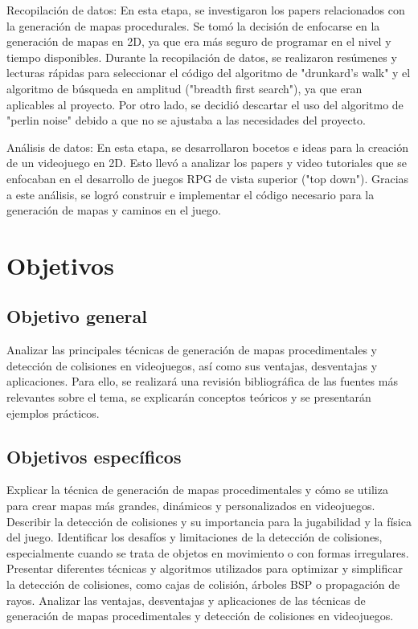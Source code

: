 \documentclass[stu, 12pt, letterpaper, donotrepeattitle, floatsintext, natbib]{apa7}
\begin{document}
Recopilación de datos:
En esta etapa, se investigaron los papers relacionados con la generación de mapas procedurales. Se tomó la decisión de enfocarse en la generación de mapas en 2D, ya que era más seguro de programar en el nivel y tiempo disponibles. Durante la recopilación de datos, se realizaron resúmenes y lecturas rápidas para seleccionar el código del algoritmo de "drunkard's walk" y el algoritmo de búsqueda en amplitud ("breadth first search"), ya que eran aplicables al proyecto. Por otro lado, se decidió descartar el uso del algoritmo de "perlin noise" debido a que no se ajustaba a las necesidades del proyecto.

Análisis de datos:
En esta etapa, se desarrollaron bocetos e ideas para la creación de un videojuego en 2D. Esto llevó a analizar los papers y video tutoriales que se enfocaban en el desarrollo de juegos RPG de vista superior ("top down"). Gracias a este análisis, se logró construir e implementar el código necesario para la generación de mapas y caminos en el juego.
\noindent {}

\vspace{10pt}
\vspace{10pt}
\vspace{10pt}
\vspace{10pt}
\vspace{10pt}
\vspace{10pt}

\section{\large Objetivos}
\subsection{Objetivo general} 
Analizar las principales técnicas de generación de mapas procedimentales y detección de colisiones en videojuegos, así como sus ventajas, desventajas y aplicaciones. Para ello, se realizará una revisión bibliográfica de las fuentes más relevantes sobre el tema, se explicarán conceptos teóricos y se presentarán ejemplos prácticos.
\subsection{Objetivos específicos} 
Explicar la técnica de generación de mapas procedimentales y cómo se utiliza para crear mapas más grandes, dinámicos y personalizados en videojuegos.
Describir la detección de colisiones y su importancia para la jugabilidad y la física del juego.
Identificar los desafíos y limitaciones de la detección de colisiones, especialmente cuando se trata de objetos en movimiento o con formas irregulares.
Presentar diferentes técnicas y algoritmos utilizados para optimizar y simplificar la detección de colisiones, como cajas de colisión, árboles BSP o propagación de rayos.
Analizar las ventajas, desventajas y aplicaciones de las técnicas de generación de mapas procedimentales y detección de colisiones en videojuegos.
\end{document}
